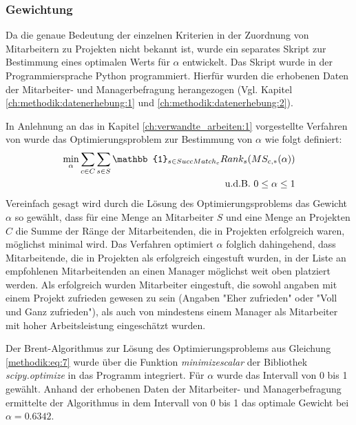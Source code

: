 \subsubsection{Gewichtung}
\label{ch:methodik:auswertung:gewichtung}
Da die genaue Bedeutung der einzelnen Kriterien in der Zuordnung von Mitarbeitern zu Projekten nicht bekannt ist, wurde ein separates Skript zur Bestimmung eines optimalen Werts für $\alpha$ entwickelt.
Das Skript wurde in der Programmiersprache Python programmiert.
Hierfür wurden die erhobenen Daten der Mitarbeiter- und Managerbefragung herangezogen (Vgl. Kapitel \ref{ch:methodik:datenerhebung:1} und \ref{ch:methodik:datenerhebung:2}).

In Anlehnung an das in Kapitel \ref{ch:verwandte_arbeiten:1} vorgestellte Verfahren von \textcite[S. 131ff.]{kleinerman:2:inproceedings} wurde das Optimierungsproblem zur Bestimmung von $\alpha$ wie folgt definiert:
\begin{equation}\label{methodik:eq:7}
    \begin{aligned}
        \min_{\alpha} \sum_{c \in C} \sum_{s \in S} \mathbb{1}_{s \in SuccMatch_{c}} Rank_{s} (MS_{c,*}(\alpha))\\
        \textnormal{u.d.B. } 0 \leq \alpha \leq 1\\
    \end{aligned}
\end{equation}
Vereinfach gesagt wird durch die Lösung des Optimierungsproblems das Gewicht $\alpha$ so gewählt, dass für eine Menge an Mitarbeiter $S$ und eine Menge an Projekten $C$ die Summe der Ränge der Mitarbeitenden, die in Projekten erfolgreich waren, möglichst minimal wird.
Das Verfahren optimiert $\alpha$ folglich dahingehend, dass Mitarbeitende, die in Projekten als erfolgreich eingestuft wurden, in der Liste an empfohlenen Mitarbeitenden an einen Manager möglichst weit oben platziert werden.
Als erfolgreich wurden Mitarbeiter eingestuft, die sowohl angaben mit einem Projekt zufrieden gewesen zu sein (Angaben "Eher zufrieden" oder "Voll und Ganz zufrieden"), als auch von mindestens einem Manager als Mitarbeiter mit hoher Arbeitsleistung eingeschätzt wurden.

Der Brent-Algorithmus zur Lösung des Optimierungsproblems aus Gleichung \ref{methodik:eq:7} wurde über die Funktion \textit{minimize\textunderscore scalar} der Bibliothek \textit{scipy.opti\-mize} in das Programm integriert.
Für $\alpha$ wurde das Intervall von 0 bis 1 gewählt.
Anhand der erhobenen Daten der Mitarbeiter- und Managerbefragung ermittelte der Algorithmus in dem Intervall von 0 bis 1 das optimale Gewicht bei $\alpha = 0.6342$.

